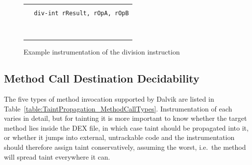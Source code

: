 \documentclass[12pt,twoside,notitlepage]{report}
\newcommand{\centerbox}[1] {
	\begin{center}
	\begin{footnotesize}
	\begin{tabular}{l}
	#1
	\end{tabular}
	\end{footnotesize}
	\end{center}
}
\newcommand{\highlight}[1]{\colorbox{lightOrange}{\strut #1}}
\newcommand{\asm}[1] {\texttt{#1}}
\newcommand{\asmExtra}[1] {\texttt{\highlight{#1}}}
\begin{document}
	\begin{figure}[H]
		\centerbox{
			\asmExtra{TRY (ArithmeticException $\Rightarrow$ CATCH\_ABC) \{} \\
			\asm{~~div-int rResult, rOpA, rOpB} \\
			\asmExtra{~~or-int tResult, tOpA, tOpB~~~~~~~~~~~~} \\
			\asmExtra{~~goto LABEL\_XYZ~~~~~~~~~~~~~~~~~~~~~~~~} \\
			\asmExtra{\}~~~~~~~~~~~~~~~~~~~~~~~~~~~~~~~~~~~~~~~} \\
			\asmExtra{CATCH\_ABC:~~~~~~~~~~~~~~~~~~~~~~~~~~~~~~} \\
			\asmExtra{move-exception pException~~~~~~~~~~~~~~~} \\
			\asmExtra{taint-set tOpB, pException~~~~~~~~~~~~~~} \\
			\asmExtra{throw pException~~~~~~~~~~~~~~~~~~~~~~~~} \\	
			\asmExtra{LABEL\_XYZ:~~~~~~~~~~~~~~~~~~~~~~~~~~~~~~}
		}
		\caption{Example instrumentation of the division instruction}
		\label{figure:TaintPropagation_ThrowingInstructions}
	\end{figure}

\subsection{Method Call Destination Decidability}
\label{section:TaintPropagation_DestDecision}

The five types of method invocation supported by Dalvik are listed in Table~\ref{table:TaintPropagation_MethodCallTypes}. Instrumentation of each varies in detail, but for tainting it is more important to know whether the target method lies inside the DEX file, in which case taint should be propagated into it, or whether it jumps into external, untrackable code and the instrumentation should therefore assign taint conservatively, assuming the worst, i.e.\ the method will spread taint everywhere it can.
\end{document}
